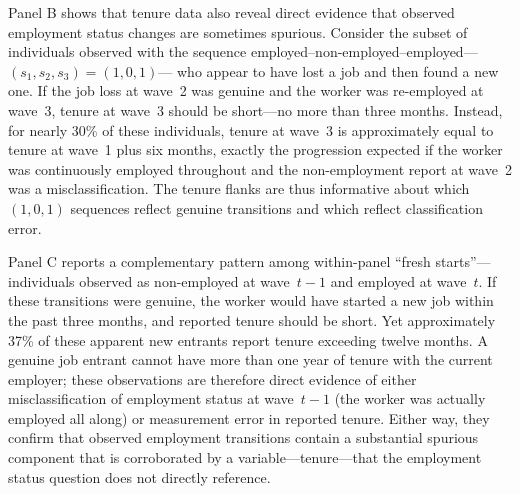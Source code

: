 Panel B shows that tenure data also reveal direct evidence that observed
employment status changes are sometimes spurious. Consider the subset of
individuals observed with the
sequence employed--non-employed--employed--- $(s_1, s_2, s_3) = (1,0,1)$--- who
appear to have lost a job and then found a new one. If the job loss at wave~2
was genuine and the worker was re-employed at wave~3, tenure at wave~3 should
be short---no more than three months. Instead, for nearly 30\% of these
individuals, tenure at wave~3 is approximately equal to tenure at wave~1 plus
six months, exactly the progression expected if the worker was continuously
employed throughout and the non-employment report at wave~2 was a
misclassification. The tenure flanks are thus informative about which
$(1,0,1)$ sequences reflect genuine transitions and which reflect classification
error.

Panel C reports a complementary pattern among within-panel ``fresh
starts''---individuals
observed as non-employed at wave~$t-1$ and employed at wave~$t$. If these
transitions were genuine, the worker would have started a new job within the
past three months, and reported tenure should be short. Yet approximately 37\%
of these apparent new entrants report tenure exceeding twelve months. A genuine
job entrant cannot have more than one year of tenure with the current employer;
these observations are therefore direct evidence of either misclassification of
employment status at wave~$t-1$ (the worker was actually employed all along) or
measurement error in reported tenure. Either way, they confirm that observed
employment transitions contain a substantial spurious component that is
corroborated by a variable---tenure---that the employment status question does
not directly reference.
